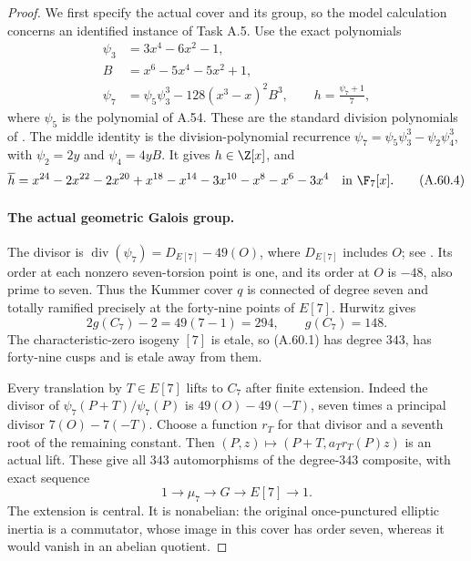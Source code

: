 \begin{proof}
We first specify the actual cover and its group, so the
model calculation concerns an identified instance of Task A.5.
Use the exact polynomials
\[
\begin{aligned}
 \psi _3&=3x^4-6x^2-1,\\
 B&=x^6-5x^4-5x^2+1,\\
 \psi _7&=\psi _5\psi _3^3-128(x^3-x)^2B^3,
 \qquad h=\frac{\psi _7+1}{7},                         \tag{A.60.3}
\end{aligned}
\]
where \(\psi _5\) is the polynomial of A.54. These are the
standard division polynomials of \cite[Exercise III.3.7,
pp.105--106]{fghSilvermanAEC}. The middle
identity is the division-polynomial recurrence
\(\psi _7=\psi _5\psi _3^3-\psi _2\psi _4^3\), with
\(\psi _2=2y\) and \(\psi _4=4yB\).
It gives \(h\in\Z[x]\), and
\[
 \overline h=x^{24}-2x^{22}-2x^{20}+x^{18}-x^{14}
                  -3x^{10}-x^8-x^6-3x^4\quad\text{in }\F_7[x].
                                                        \tag{A.60.4}
\]

\paragraph{The actual geometric Galois group.}
The divisor is
\(\operatorname{div}(\psi _7)=D_{E[7]}-49(O)\),
where \(D_{E[7]}\) includes \(O\); see
\cite[Exercise III.3.7(f), p.106]{fghSilvermanAEC}. Its order at each
nonzero seven-torsion point is one, and its order at
\(O\) is \(-48\), also prime to seven. Thus the
Kummer cover \(q\) is connected of degree seven and
totally ramified precisely at the forty-nine points of
\(E[7]\). Hurwitz gives
\[
                2g(C_7)-2=49(7-1)=294,
                           \qquad g(C_7)=148.          \tag{A.60.5}
\]
The characteristic-zero isogeny \([7]\) is etale, so
(A.60.1) has degree \(343\), has forty-nine cusps and
is etale away from them.

Every translation by \(T\in E[7]\) lifts to \(C_7\)
after finite extension. Indeed the divisor of
\(\psi _7(P+T)/\psi _7(P)\) is
\(49(O)-49(-T)\), seven times a principal divisor
\(7(O)-7(-T)\). Choose a function \(r_T\) for that
divisor and a seventh root of the remaining constant.
Then \((P,z)\mapsto(P+T,a_T r_T(P)z)\) is an actual
lift. These give all \(343\) automorphisms of the
degree-\(343\) composite, with exact sequence
\[
                 1\longrightarrow\mu _7
                 \longrightarrow G\longrightarrow E[7]
                 \longrightarrow1.                   \tag{A.60.6}
\]
The extension is central. It is nonabelian: the original
once-punctured elliptic inertia is a commutator, whose
image in this cover has order seven, whereas it would
vanish in an abelian quotient.


\end{proof}
